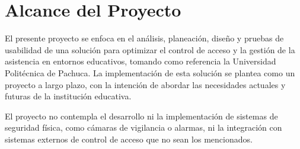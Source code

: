 \section{Alcance del Proyecto}


El presente proyecto se enfoca en el análisis, planeación, diseño y pruebas de usabilidad de una solución para optimizar el control de acceso y la gestión de la asistencia en entornos educativos, tomando como referencia la Universidad Politécnica de Pachuca. La implementación de esta solución se plantea como un proyecto a largo plazo, con la intención de abordar las necesidades actuales y futuras de la institución educativa.


El proyecto no contempla el desarrollo ni la implementación de sistemas de seguridad física, como cámaras de vigilancia o alarmas, ni la integración con sistemas externos de control de acceso que no sean los mencionados.

